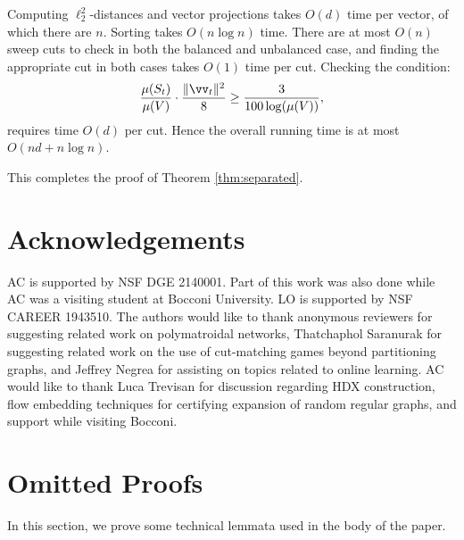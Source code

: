 \documentclass[letterpaper]{article}
\begin{document}
Computing $\ell_2^2$-distances and vector projections takes $O(d)$ time per vector, of which there are $n$. Sorting takes $O(n\log n)$ time. There are at most $O(n)$ sweep cuts to check in both the balanced and unbalanced case, and finding the appropriate cut in both cases takes $O(1)$ time per cut. Checking the condition:
\[
    \frac{\mu(S_t)}{\mu(V)} \cdot \frac{\|\vv_t\|^2}{8} \geq \frac{3}{100 \log(\mu(V))},
\]
requires time $O(d)$ per cut. Hence the overall running time is at most $O(nd + n \log n)$.

This completes the proof of Theorem \ref{thm:separated}.
 

\section{Acknowledgements}

AC is supported by NSF DGE 2140001. Part of this work was also done while AC was a visiting student at Bocconi University. LO is supported by NSF CAREER 1943510. The authors would like to thank anonymous reviewers for suggesting related work on polymatroidal networks, Thatchaphol Saranurak for suggesting related work on the use of cut-matching games beyond partitioning graphs, and Jeffrey Negrea for assisting on topics related to online learning. AC would like to thank Luca Trevisan for discussion regarding HDX construction, flow embedding techniques for certifying expansion of random regular graphs, and support while visiting Bocconi.

\newpage






\newpage
\appendix
\section{Omitted Proofs}
\label{sec.appendix.omitted}

In this section, we prove some technical lemmata used in the body of the paper.
\end{document}
